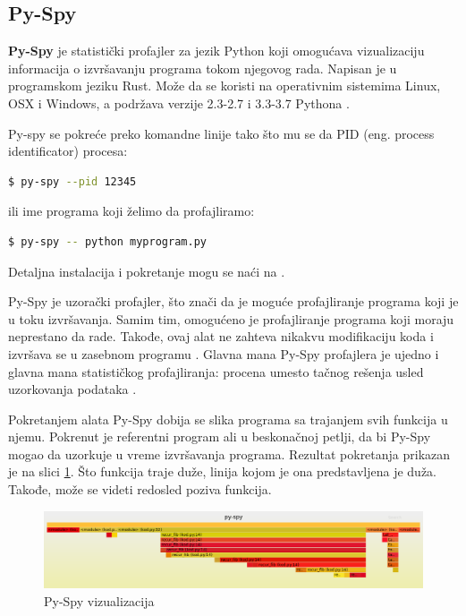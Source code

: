 \documentclass[a4paper]{article}
\begin{document}
\subsection{Py-Spy}
\label{profajler_3}
\textbf{Py-Spy} je statistički profajler za jezik Python koji omogućava vizualizaciju informacija o izvršavanju programa tokom njegovog rada. Napisan je u programskom jeziku Rust. Može da se koristi na operativnim sistemima Linux, OSX i Windows, a podržava verzije 2.3-2.7 i 3.3-3.7 Pythona \cite{PySpy1}.
\par
Py-spy se pokreće preko komandne linije tako što mu se da PID (eng. process identificator) procesa:
\begin{lstlisting}[language=bash, belowskip=-\baselineskip]
  $ py-spy --pid 12345
\end{lstlisting}
ili ime programa koji želimo da profajliramo:
\begin{lstlisting}[language=bash, belowskip=-\baselineskip]
  $ py-spy -- python myprogram.py
\end{lstlisting}
Detaljna instalacija i pokretanje mogu se naći na \cite{PySpy1}.

Py-Spy je uzorački profajler, što znači da je moguće profajliranje programa koji je u toku izvršavanja. Samim tim, omogućeno je profajliranje programa koji moraju neprestano da rade. Takođe, ovaj alat ne zahteva nikakvu modifikaciju koda i izvršava se u zasebnom programu \cite{PySpy2}. Glavna mana Py-Spy profajlera je ujedno i glavna mana statističkog profajliranja: procena umesto tačnog rešenja usled uzorkovanja podataka \cite{StatProf2}. 

Pokretanjem alata Py-Spy dobija se slika programa sa trajanjem svih funkcija u njemu. Pokrenut je referentni program ali u beskonačnoj petlji, da bi Py-Spy mogao da uzorkuje u vreme izvršavanja programa. Rezultat pokretanja prikazan je na slici \ref{fig:ps_viz}. Što funkcija traje duže, linija kojom je ona predstavljena je duža. Takođe, može se videti redosled poziva funkcija. 
\begin{figure}[h!]
\begin{center}
\includegraphics[scale=0.26]{ps.png}
\end{center}
\caption{Py-Spy vizualizacija}
\label{fig:ps_viz}
\end{figure}
\end{document}
